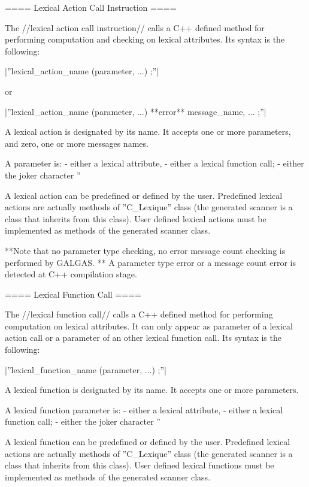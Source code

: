==== Lexical Action Call Instruction ====

The //lexical action call instruction// calls a C++ defined method for performing computation and checking on lexical attributes. Its syntax is the following:

|''lexical\_action\_name (parameter, ...) ;''|

or

|''lexical\_action\_name (parameter, ...) **error** message\_name, ... ;''|

A lexical action is designated by its name. It accepts one or more parameters, and zero, one or more messages names.

A parameter is:
  - either a lexical attribute,
  - either a lexical function call;
  - either the joker character ''%

A lexical action can be predefined or defined by the user. Predefined lexical actions are actually methods of ''C\_Lexique'' class (the generated scanner is a class that inherits from this class). User defined lexical actions must be implemented as methods of the generated scanner class.

**Note that no parameter type checking, no error message count checking is performed by GALGAS. ** A parameter type error or a message count error is detected at C++ compilation stage.
 
==== Lexical Function Call ====

The //lexical function call// calls a C++ defined method for performing computation on lexical attributes. It can only appear as parameter of a lexical action call or a parameter of an other lexical function call. Its syntax is the following:

|''lexical\_function\_name (parameter, ...) ;''|

A lexical function is designated by its name. It accepts one or more parameters.

A lexical function parameter is:
  - either a lexical attribute,
  - either a lexical function call;
  - either the joker character ''%

A lexical function can be predefined or defined by the user. Predefined lexical actions are actually methods of ''C\_Lexique'' class (the generated scanner is a class that inherits from this class). User defined lexical functions must be implemented as methods of the generated scanner class.

